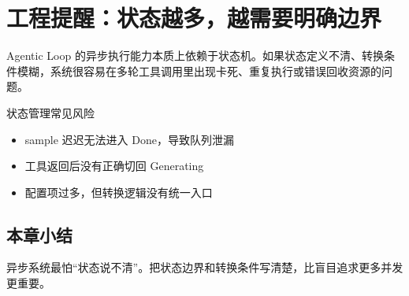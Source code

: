 \section{工程提醒：状态越多，越需要明确边界}
Agentic Loop 的异步执行能力本质上依赖于状态机。如果状态定义不清、转换条件模糊，系统很容易在多轮工具调用里出现卡死、重复执行或错误回收资源的问题。

\begin{warningbox}{状态管理常见风险}
\begin{itemize}
  \item sample 迟迟无法进入 Done，导致队列泄漏
  \item 工具返回后没有正确切回 Generating
  \item 配置项过多，但转换逻辑没有统一入口
\end{itemize}
\end{warningbox}

\subsection{本章小结}
异步系统最怕“状态说不清”。把状态边界和转换条件写清楚，比盲目追求更多并发更重要。

\newpage
